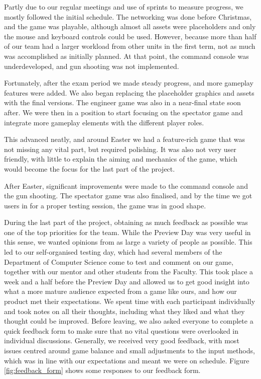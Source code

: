 \documentclass[a4paper,11pt]{article}
\begin{document}
Partly due to our regular meetings and use of sprints to measure progress, we mostly followed the initial schedule. The networking was done before Christmas, and the game was playable, although almost all assets were placeholders and only the mouse and keyboard controls could be used. However, because more than half of our team had a larger workload from other units in the first term, not as much was accomplished as initially planned. At that point, the command console was underdeveloped, and gun shooting was not implemented.

Fortunately, after the exam period we made steady progress, and more gameplay features were added. We also began replacing the placeholder graphics and assets with the final versions. The engineer game was also in a near-final state soon after. We were then in a position to start focusing on the spectator game and integrate more gameplay elements with the different player roles.

This advanced neatly, and around Easter we had a feature-rich game that was not missing any vital part, but required polishing. It was also not very user friendly, with little to explain the aiming and mechanics of the game, which would become the focus for the last part of the project.

After Easter, significant improvements were made to the command console and the gun shooting. The spectator game was also finalised, and by the time we got users in for a proper testing session, the game was in good shape.

During the last part of the project, obtaining as much feedback as possible was one of the top priorities for the team. While the Preview Day was very useful in this sense, we wanted opinions from as large a variety of people as possible. This led to our self-organised testing day, which had several members of the Department of Computer Science come to test and comment on our game, together with our mentor and other students from the Faculty. This took place a week and a half before the Preview Day and allowed us to get good insight into what a more mature audience expected from a game like ours, and how our product met their expectations. We spent time with each participant individually and took notes on all their thoughts, including what they liked and what they thought could be improved. Before leaving, we also asked everyone to complete a quick feedback form to make sure that no vital questions were overlooked in individual discussions. Generally, we received very good feedback, with most issues centred around game balance and small adjustments to the input methods, which was in line with our expectations and meant we were on schedule. Figure \ref{fig:feedback_form} shows some responses to our feedback form.
\end{document}
